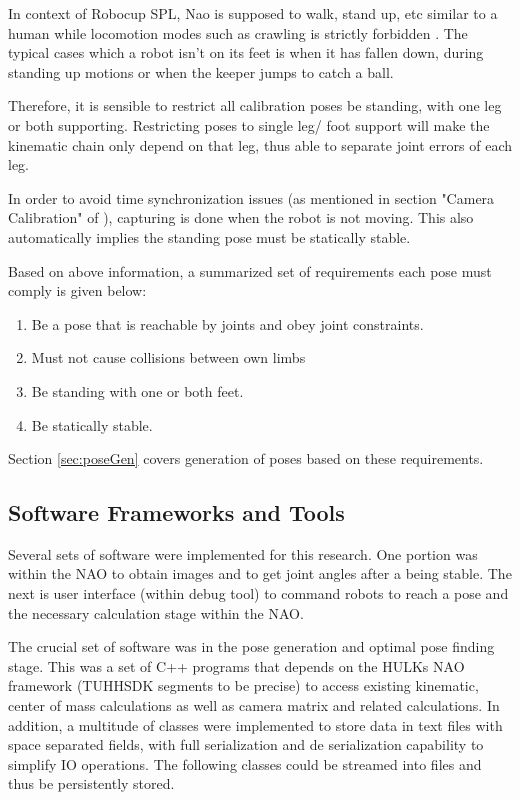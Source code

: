 \documentclass[english, printversion, nomenclature, notitle]{tuvisionthesis} %
\begin{document}
In context of Robocup SPL, Nao is supposed to walk, stand up, etc similar to a human while locomotion modes such as crawling is strictly forbidden \cite{robocup_technical_committee_robocup_2018}. The typical cases which a robot isn't on its feet is when it has fallen down, during standing up motions or when the keeper jumps to catch a ball.

Therefore, it is sensible to restrict all calibration poses be standing, with one leg or both supporting. Restricting poses to single leg/ foot support will make the kinematic chain only depend on that leg, thus able to separate joint errors of each leg.

In order to avoid time synchronization issues (as mentioned in section "Camera Calibration" of \cite{darshana_adikari_team_2017}), capturing is done when the robot is not moving. This also automatically implies the standing pose must be statically stable.

Based on above information, a summarized set of requirements each pose must comply is given below:
\begin{enumerate}
	\label{items:conditionsForPose}
	\item Be a pose that is reachable by joints and obey joint constraints.
	\item Must not cause collisions between own limbs
	\item Be standing with one or both feet.
	\item Be statically stable.
\end{enumerate}

Section \ref{sec:poseGen} covers generation of poses based on these requirements.

\subsection{Software Frameworks and Tools}

Several sets of software were implemented for this research. One portion was within the NAO to obtain images and to get joint angles after a being stable. The next is user interface (within debug tool) to command robots to reach a pose and the necessary calculation stage within the NAO.

The crucial set of software was in the pose generation and optimal pose finding stage. This was a set of C++ programs that depends on the HULKs NAO framework (TUHHSDK segments to be precise) to access existing kinematic, center of mass calculations as well as camera matrix and related calculations. In addition, a multitude of classes were implemented to store data in text files with space separated fields, with full serialization and de serialization capability to simplify IO operations. The following classes could be streamed into files and thus be persistently stored.
\end{document}
